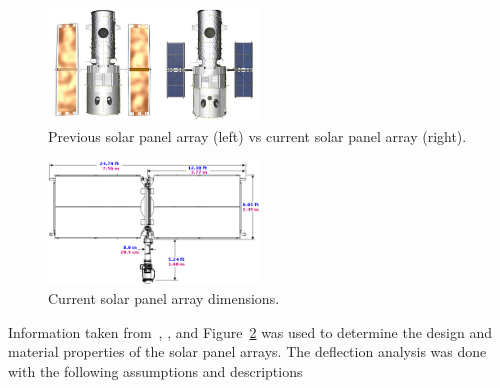 \documentclass[paper=letter, fontsize=11pt]{scrartcl} %
\numberwithin{equation}{section} %
\numberwithin{figure}{section} %
\numberwithin{table}{section} %
\begin{document}
\begin{figure}[H]
    \begin{center}
    \includegraphics[width=0.5\textwidth]{Pics/10.png}
    \caption{Previous solar panel array (left) vs current solar panel array (right).}
    \label{fig:p10}
    \end{center}
\end{figure}

\begin{figure}[H]
    \begin{center}
    \includegraphics[width=0.5\textwidth]{Pics/11.png}
    \caption{Current solar panel array dimensions.}
    \label{fig:p11}
    \end{center}
\end{figure}

Information taken from~\cite{csm}, \cite{mech3}, and Figure~\ref{fig:p11} was used to determine the design and material properties of the solar panel arrays. The deflection analysis was done with the following assumptions and descriptions
\end{document}
